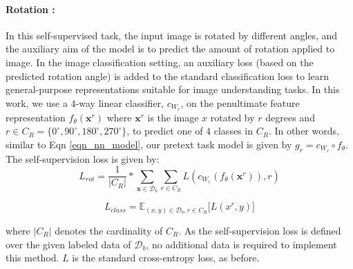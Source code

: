 \documentclass[10pt,twocolumn,letterpaper]{article}
\begin{document}
\paragraph{Rotation \cite{Spyros2018rotate}:}
In this self-supervised task, the input image is rotated by different angles, and the auxiliary aim of the model is to predict the amount of rotation applied to image. In the image classification setting, an auxiliary loss (based on the predicted rotation angle) is added to the standard classification loss to learn general-purpose representations suitable for image understanding tasks. In this work, we use a $4$-way linear classifier, $c_{W_r}$, on the penultimate feature representation $f_{\theta}(\textbf{x}^r)$ where $\textbf{x}^r$ is the image $x$ rotated by $r$ degrees and $r \in C_R = \{0^{\circ},90^{\circ},180^{\circ},270^{\circ}\}$, to predict one of $4$ classes in $C_R$. In other words, similar to Eqn \ref{eqn_nn_model}, our pretext task model is given by $g_r = c_{W_r} \circ f_{\theta}$. The self-supervision loss is given by:
\begin{equation}
    L_{rot} = \frac{1}{|C_R|}*\sum\limits_{\textbf{x} \in \mathcal{D}_b} \sum\limits_{r \in C_R} L(c_{W_r}(f_{\theta}(\textbf{x}^r)) ,r)
\label{eqn_rot_selfsup_loss}
\end{equation}

\begin{equation}
    L_{class} = \mathbb{E}_{(x,y) \in \mathcal{D}_b , r \in C_R}  \big[ L (x^r,y) \big]
\label{eq:class-loss}
\end{equation}

\noindent where $|C_R|$ denotes the cardinality of $C_R$. As the self-supervision loss is defined over the given labeled data of $\mathcal{D}_b$, no additional data is required to implement this method. $L$ is the standard cross-entropy loss, as before.
\end{document}
